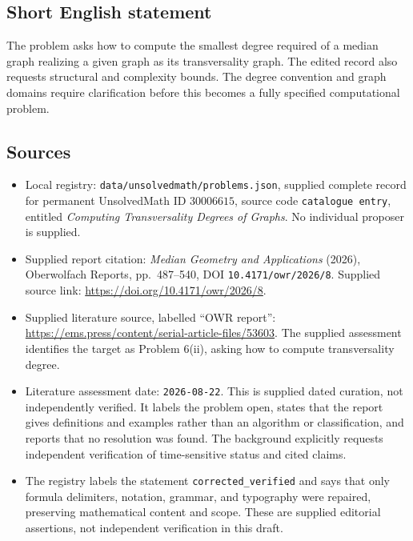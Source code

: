 \documentclass[11pt]{article}
\begin{document}
\subsection{Short English statement}
The problem asks how to compute the smallest degree required of a median graph realizing a given graph as its transversality graph. The edited record also requests structural and complexity bounds. The degree convention and graph domains require clarification before this becomes a fully specified computational problem.
\subsection{Sources}
\begin{itemize}
\item Local registry: \texttt{data/unsolvedmath/problems.json}, supplied complete record for permanent UnsolvedMath ID \(30006615\), source code \texttt{catalogue entry}, entitled \emph{Computing Transversality Degrees of Graphs}. No individual proposer is supplied.
\item Supplied report citation: \emph{Median Geometry and Applications} (2026), Oberwolfach Reports, pp.\ 487--540, DOI \texttt{10.4171/owr/2026/8}. Supplied source link: \url{https://doi.org/10.4171/owr/2026/8}.
\item Supplied literature source, labelled ``OWR report'': \url{https://ems.press/content/serial-article-files/53603}. The supplied assessment identifies the target as Problem 6(ii), asking how to compute transversality degree.
\item Literature assessment date: \texttt{2026-08-22}. This is supplied dated curation, not independently verified. It labels the problem open, states that the report gives definitions and examples rather than an algorithm or classification, and reports that no resolution was found. The background explicitly requests independent verification of time-sensitive status and cited claims.
\item The registry labels the statement \texttt{corrected\_verified} and says that only formula delimiters, notation, grammar, and typography were repaired, preserving mathematical content and scope. These are supplied editorial assertions, not independent verification in this draft.
\end{itemize}
\end{document}
